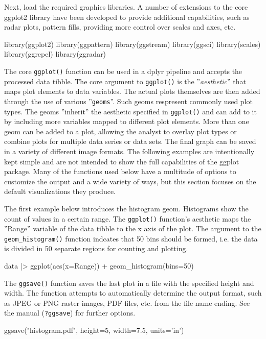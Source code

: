 \noindent Next, load the required graphics libraries. A number of extensions to the core ggplot2 library have been developed to provide additional capabilities, such as radar plots, pattern fills, providing more control over scales and axes, etc.

\begin{samepage}
\begin{Rcode}
library(ggplot2)
library(ggpattern)
library(ggstream)
library(ggsci)
library(scales)
library(ggrepel)
library(ggradar)
\end{Rcode}
\end{samepage}

The core \texttt{ggplot()} function can be used in a dplyr pipeline and accepts the processed data tibble. The core argument to \texttt{ggplot()} is the ''\emph{aesthetic}'' that maps plot elements to data variables. The actual plots themselves are then added through the use of various ''\texttt{geoms}''. Such geoms respresent commonly used plot types. The geoms ''inherit'' the aesthetic specified in \texttt{ggplot()} and can add to it by including more variables mapped to different plot elements. More than one geom can be added to a plot, allowing the analyst to overlay plot types or combine plots for multiple data series or data sets. The final graph can be saved in a variety of different image formats. The following examples are intentionally kept simple and are not intended to show the full capabilities of the ggplot package. Many of the functions used below have a multitude of options to customize the output and a wide variety of ways, but this section focuses on the default visualizations they produce.

The first example below introduces the histogram geom. Histograms show the count of values in a certain range. The \texttt{ggplot()} function's aesthetic maps the ''Range'' variable of the data tibble to the x axis of the plot. The argument to the \texttt{geom\_histogram()} function indcates that 50 bins should be formed, i.e. the data is divided in 50 separate regions for counting and plotting.

\begin{samepage}
\begin{Rcode}
data |> 
  ggplot(aes(x=Range)) + 
    geom_histogram(bins=50)
\end{Rcode}

The \texttt{ggsave()} function saves the last plot in a file with the specified height and width. The function attempts to automatically determine the output format, such as JPEG or PNG raster images, PDF files, etc. from the file name ending. See the manual (\texttt{?ggsave}) for further options. 

\begin{Rcode}
ggsave("histogram.pdf", height=5, width=7.5, units='in')
\end{Rcode}
\end{samepage}

